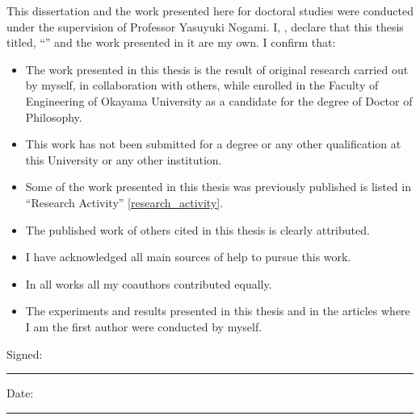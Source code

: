 \documentclass[
11pt, %
english, %
singlespacing, %
headsepline, %
]{MastersDoctoralThesis} %
\begin{document}

\begin{declaration}
	
\addchaptertocentry{\authorshipname} %
\noindent This dissertation and the work presented here for doctoral studies were conducted under the supervision of Professor Yasuyuki Nogami.
 I, \authorname, declare that this thesis titled, \enquote{\ttitle} and the work presented in it are my own. I confirm that:

\begin{itemize} 
\item 
The work presented in this thesis is the result of original research carried out by myself, in collaboration with others, while enrolled in the Faculty of Engineering of Okayama University as a candidate for the degree of Doctor of Philosophy.

\item This work has not been submitted for a degree or any other qualification at this University or any other institution. 
 
\item  Some of the work presented in this thesis was previously published is listed in ``Research Activity'' \ref{research_activity}.

\item The published work of others cited in this thesis is clearly attributed.
\item I have acknowledged all main sources of help to pursue this work.
 \item In all works all my coauthors contributed equally. 
 \item The experiments and results presented in this thesis and in the articles where I am the first author were conducted by myself.\\
\end{itemize}
 
\noindent Signed:\\ 
\rule[0.5em]{25em}{0.5pt}
 
\noindent Date:\\
\rule[0.5em]{25em}{0.5pt} %
\end{declaration}
\end{document}
